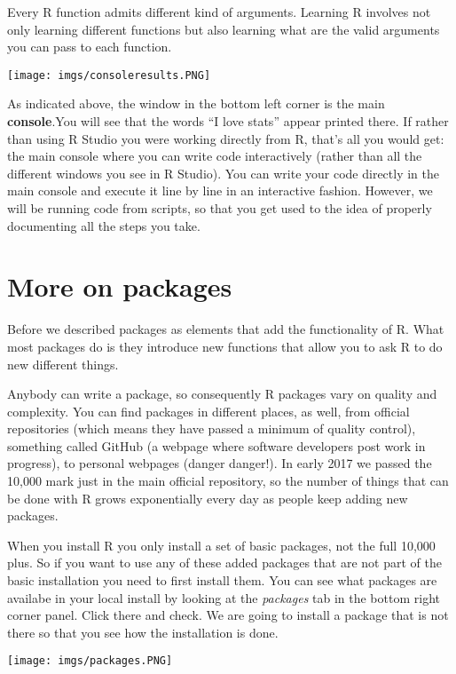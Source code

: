 \documentclass[
]{book}
\begin{document}
Every R function admits different kind of arguments. Learning R involves not only learning different functions but also learning what are the valid arguments you can pass to each function.

\texttt{[image: imgs/consoleresults.PNG]}

As indicated above, the window in the bottom left corner is the main \textbf{console}.You will see that the words ``I love stats'' appear printed there. If rather than using R Studio you were working directly from R, that's all you would get: the main console where you can write code interactively (rather than all the different windows you see in R Studio). You can write your code directly in the main console and execute it line by line in an interactive fashion. However, we will be running code from scripts, so that you get used to the idea of properly documenting all the steps you take.

\section{More on packages}\label{more-on-packages}

Before we described packages as elements that add the functionality of R. What most packages do is they introduce new functions that allow you to ask R to do new different things.

Anybody can write a package, so consequently R packages vary on quality and complexity. You can find packages in different places, as well, from official repositories (which means they have passed a minimum of quality control), something called GitHub (a webpage where software developers post work in progress), to personal webpages (danger danger!). In early 2017 we passed the 10,000 mark just in the main official repository, so the number of things that can be done with R grows exponentially every day as people keep adding new packages.

When you install R you only install a set of basic packages, not the full 10,000 plus. So if you want to use any of these added packages that are not part of the basic installation you need to first install them. You can see what packages are availabe in your local install by looking at the \emph{packages} tab in the bottom right corner panel. Click there and check. We are going to install a package that is not there so that you see how the installation is done.

\texttt{[image: imgs/packages.PNG]}
\end{document}
